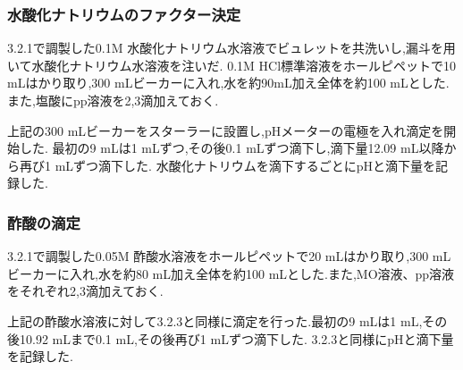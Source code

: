 \subsubsection{水酸化ナトリウムのファクター決定}
3.2.1で調製した0.1M 水酸化ナトリウム水溶液でビュレットを共洗いし,漏斗を用いて水酸化ナトリウム水溶液を注いだ.
0.1M HCl標準溶液をホールピペットで10 \si{\milli L}はかり取り,300 \si{\milli L}ビーカーに入れ,水を約90\si{\milli L}加え全体を約100 \si{\milli L}とした.また,塩酸にpp溶液を2,3滴加えておく.

上記の300 \si{\milli L}ビーカーをスターラーに設置し,pHメーターの電極を入れ滴定を開始した.
最初の9 \si{\milli L}は1 \si{\milli L}ずつ,その後0.1 \si{\milli L}ずつ滴下し,滴下量12.09 \si{\milli L}以降から再び1 \si{\milli L}ずつ滴下した.
水酸化ナトリウムを滴下するごとにpHと滴下量を記録した.
\subsubsection{酢酸の滴定}
3.2.1で調製した0.05M 酢酸水溶液をホールピペットで20 \si{\milli L}はかり取り,300 \si{\milli L}ビーカーに入れ,水を約80 \si{\milli L}加え全体を約100 \si{\milli L}とした.また,MO溶液、pp溶液をそれぞれ2,3滴加えておく.

上記の酢酸水溶液に対して3.2.3と同様に滴定を行った.最初の9 \si{\milli L}は1 \si{\milli L},その後10.92 \si{\milli L}まで0.1 \si{\milli L},その後再び1 \si{\milli L}ずつ滴下した.
3.2.3と同様にpHと滴下量を記録した.